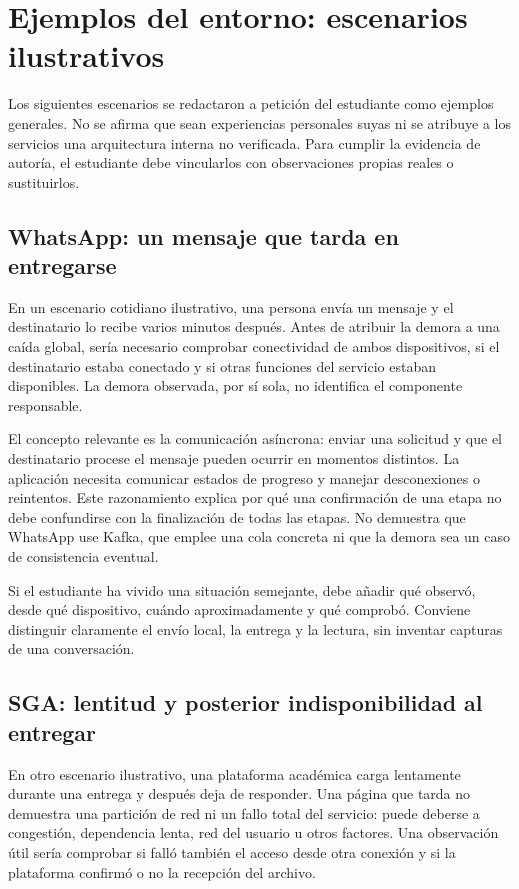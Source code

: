 \documentclass[11pt,a4paper]{article}
\begin{document}
\section{Ejemplos del entorno: escenarios ilustrativos}
Los siguientes escenarios se redactaron a petición del estudiante como ejemplos generales. No se afirma que sean experiencias personales suyas ni se atribuye a los servicios una arquitectura interna no verificada. Para cumplir la evidencia de autoría, el estudiante debe vincularlos con observaciones propias reales o sustituirlos.

\subsection{WhatsApp: un mensaje que tarda en entregarse}
En un escenario cotidiano ilustrativo, una persona envía un mensaje y el destinatario lo recibe varios minutos después. Antes de atribuir la demora a una caída global, sería necesario comprobar conectividad de ambos dispositivos, si el destinatario estaba conectado y si otras funciones del servicio estaban disponibles. La demora observada, por sí sola, no identifica el componente responsable.

El concepto relevante es la comunicación asíncrona: enviar una solicitud y que el destinatario procese el mensaje pueden ocurrir en momentos distintos. La aplicación necesita comunicar estados de progreso y manejar desconexiones o reintentos. Este razonamiento explica por qué una confirmación de una etapa no debe confundirse con la finalización de todas las etapas. No demuestra que WhatsApp use Kafka, que emplee una cola concreta ni que la demora sea un caso de consistencia eventual.

Si el estudiante ha vivido una situación semejante, debe añadir qué observó, desde qué dispositivo, cuándo aproximadamente y qué comprobó. Conviene distinguir claramente el envío local, la entrega y la lectura, sin inventar capturas de una conversación.

\subsection{SGA: lentitud y posterior indisponibilidad al entregar}
En otro escenario ilustrativo, una plataforma académica carga lentamente durante una entrega y después deja de responder. Una página que tarda no demuestra una partición de red ni un fallo total del servicio: puede deberse a congestión, dependencia lenta, red del usuario u otros factores. Una observación útil sería comprobar si falló también el acceso desde otra conexión y si la plataforma confirmó o no la recepción del archivo.
\end{document}
